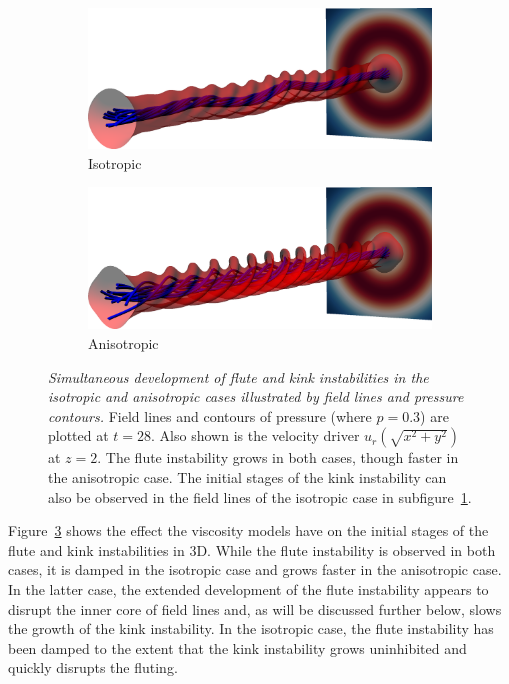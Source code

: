 \documentclass[fleqn,usenatbib]{mnras}
\newcommand{\rs}[2]{{#2}}
\newcommand{\mycaption}[2]{\caption[#1]{\emph{#1} #2}}
\begin{document}
\begin{figure}
  \centering
    \begin{subfigure}{0.49\textwidth}
      \includegraphics[width=\linewidth]{field_line_plots/cropped/v-4r-4-isotropic_0014_cropped.png}
      \caption{Isotropic}
      \label{fig:field_line_plots_iso}
    \end{subfigure}
    \hfill
    \begin{subfigure}{0.49\textwidth}
      \includegraphics[width=\linewidth]{field_line_plots/cropped/v-4r-4-switching_0014_cropped.png}
      \caption{\rs{Switching}{Anisotropic}}
      \label{fig:field_line_plots_swi}
    \end{subfigure}
\mycaption{Simultaneous development of flute and kink
  instabilities in the isotropic and \rs{switching}{anisotropic} cases
  \rs{as}{illustrated by} field lines and pressure contours.}{Field
  lines and contours of pressure (where $p=0.3$) are plotted at
  $t=28$. Also shown is the velocity driver \rs{as a slice}{$u_r(\sqrt{x^2+y^2})$ at $z=2$}. The flute instability grows in both cases, though faster in the \rs{switching}{anisotropic} case. The initial stages of the kink instability can also be observed in the field lines of the isotropic case in subfigure~\ref{fig:field_line_plots_iso}.}
\label{fig:kink_field_line_plots}%
\end{figure}

Figure~\ref{fig:kink_field_line_plots} shows the effect the viscosity
models have on the initial stages of the flute and kink
instabilities in 3D. While the flute instability is
observed in both cases, it is damped in the isotropic case and grows
faster in the \rs{switching}{anisotropic} case. In the latter case,
the extended development of the flute instability
appears to disrupt the inner core of field lines and, \rs{(as shall be
  seen)}{as will be discussed further below,} slows the growth of the
kink instability. In the isotropic case, the flute
instability has been damped to the extent that the kink instability
grows uninhibited and quickly disrupts the fluting. 
\end{document}
